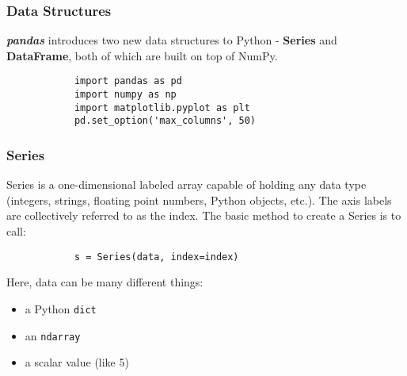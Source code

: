 \documentclass[KSmainSlides.tex]{subfiles}
\begin{document}
 
	
	
	
	\begin{frame}[fragile]
		\frametitle{Data Structures}	
		\textbf{\textit{pandas}} introduces two new data structures to Python - \textbf{Series} and \textbf{DataFrame}, both of which are built on top of NumPy.
		
		\begin{framed}
			\begin{verbatim}
			import pandas as pd
			import numpy as np
			import matplotlib.pyplot as plt
			pd.set_option('max_columns', 50)
			\end{verbatim}
		\end{framed}
		
	\end{frame}
	\begin{frame}[fragile]
		\frametitle{Series}
		
		Series is a one-dimensional labeled array capable of holding any data type (integers, strings, floating point numbers, Python objects, etc.). The axis labels are collectively referred to as the index. The basic method to create a Series is to call:
		
		\begin{framed}
			\begin{verbatim}
			s = Series(data, index=index)
			\end{verbatim}
		\end{framed} 
		Here, data can be many different things:
		
		\begin{itemize}
			\item a Python \texttt{dict}
			\item an \texttt{ndarray}
			\item a scalar value (like 5)
		\end{itemize}
		
	\end{frame}
\end{document}
